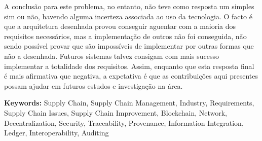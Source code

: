 A conclusão para este problema, no entanto, não teve como resposta um simples sim ou não, havendo alguma incerteza associada ao uso da tecnologia. O facto é que a arquitetura desenhada provou conseguir aguentar com a maioria dos requisitos necessários, mas a implementação de outros não foi conseguida, não sendo possível provar que são impossíveis de implementar por outras formas que não a desenhada. Futuros sistemas talvez consigam com mais sucesso implementar a totalidade dos requisitos. Assim, enquanto que esta resposta final é mais afirmativa que negativa, a expetativa é que as contribuições aqui presentes possam ajudar em futuros estudos e investigação na área.

\textbf{Keywords:} Supply Chain, Supply Chain Management, Industry, Requirements, Supply Chain Issues, Supply Chain Improvement, Blockchain, Network, Decentralization, Security, Traceability, Provenance, Information Integration, Ledger, Interoperability, Auditing






